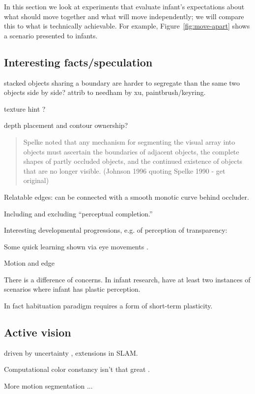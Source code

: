 In this section we look at experiments that evaluate infant's
expectations about what should move together and what will move
independently; we will compare this to what is technically achievable.
For example, Figure~\ref{fig:move-apart} shows a scenario presented to
infants.


\subsection{Interesting facts/speculation}

stacked objects sharing a boundary are harder
to segregate than the same two objects
side by side?  attrib to needham by xu,
paintbrush/keyring.

\cite{smith03motion}

texture hint \cite{johnson96perception}?

depth placement and contour ownership?

\begin{quote}

Spelke noted that any mechanism for segmenting the visual array
into objects must ascertain the boundaries of adjacent objects,
the complete shapes of partly occluded objects, and the continued
existence of objects that are no longer visible.
(Johnson 1996 quoting Spelke 1990 - get original)

\end{quote}

Relatable edges: can be connected with a smooth monotic
curve behind occluder.

Including and excluding ``perceptual completion.''

Interesting developmental progressions, e.g. of perception
of transparency: \cite{johnson00infants}


Some quick learning shown via eye movements \cite{johnson03development}.

Motion and edge \cite{smith03motion}

There is a difference of concerns.  In infant research, have
at least two instances of scenarios where infant has
plastic perception.

In fact habituation paradigm requires a form of short-term
plasticity. 


\subsection{Active vision}

\cite{bajcsy88active,aloimonos87active,ballard91animate}

driven by uncertainty \cite{whaite97autonomous}, 
extensions in SLAM.

Computational color constancy isn't that great
\cite{barnard02comparison}.

More motion segmentation \cite{smith04layered}...

\newpage

\ 

\newpage

